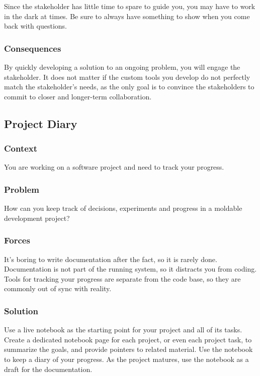 \documentclass[sigconf]{acmart}
\begin{document}
Since the stakeholder has little time to spare to guide you, you may have to work in the dark at times.
Be sure to always have something to show when you come back with questions.

\subsubsection*{Consequences}
By quickly developing a solution to an ongoing problem, you will engage the stakeholder.
It does not matter if the custom tools you develop do not perfectly match the stakeholder's needs, as the only goal is to convince the stakeholders to commit to closer and longer-term collaboration.

\subsection*{Project Diary}\label{pat:projectDiary}

\subsubsection*{Context}
You are working on a software project and need to track your progress.

\subsubsection*{Problem}
How can you keep track of decisions, experiments and progress in a moldable development project?

\subsubsection*{Forces}
It's boring to write documentation after the fact, so it is rarely done.
Documentation is not part of the running system, so it distracts you from coding.
Tools for tracking your progress are separate from the code base, so they are commonly out of sync with reality.

\subsubsection*{Solution}
Use a live notebook as the starting point for your project and all of its tasks.
Create a dedicated notebook page for each project, or even each project task, to summarize the goals, and provide pointers to related material.
Use the notebook to keep a diary of your progress.
As the project matures, use the notebook as a draft for the documentation.
\end{document}
